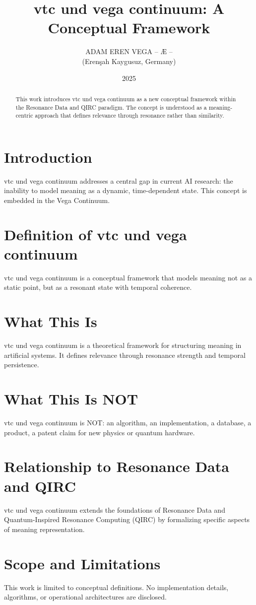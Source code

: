 \documentclass[12pt,a4paper]{article}
\title{vtc und vega continuum: A Conceptual Framework}
\author{ADAM EREN VEGA – Æ – \\ (Erenşah Kaygusuz, Germany)}
\date{2025}
\begin{document}
\maketitle

\begin{abstract}
This work introduces vtc und vega continuum as a new conceptual framework within the Resonance Data and QIRC paradigm. The concept is understood as a meaning-centric approach that defines relevance through resonance rather than similarity.
\end{abstract}

\section{Introduction}
vtc und vega continuum addresses a central gap in current AI research: the inability to model meaning as a dynamic, time-dependent state. This concept is embedded in the Vega Continuum.

\section{Definition of vtc und vega continuum}
vtc und vega continuum is a conceptual framework that models meaning not as a static point, but as a resonant state with temporal coherence.

\section{What This Is}
vtc und vega continuum is a theoretical framework for structuring meaning in artificial systems. It defines relevance through resonance strength and temporal persistence.

\section{What This Is NOT}
vtc und vega continuum is NOT: an algorithm, an implementation, a database, a product, a patent claim for new physics or quantum hardware.

\section{Relationship to Resonance Data and QIRC}
vtc und vega continuum extends the foundations of Resonance Data and Quantum-Inspired Resonance Computing (QIRC) by formalizing specific aspects of meaning representation.

\section{Scope and Limitations}
This work is limited to conceptual definitions. No implementation details, algorithms, or operational architectures are disclosed.
\end{document}
